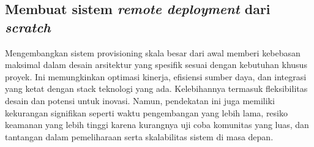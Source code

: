 \subsection{Membuat sistem \textit{remote deployment} dari \textit{scratch}}
Mengembangkan sistem provisioning skala besar dari awal memberi kebebasan maksimal dalam desain arsitektur yang spesifik sesuai dengan kebutuhan khusus proyek. Ini memungkinkan optimasi kinerja, efisiensi sumber daya, dan integrasi yang ketat dengan stack teknologi yang ada. Kelebihannya termasuk fleksibilitas desain dan potensi untuk inovasi. Namun, pendekatan ini juga memiliki kekurangan signifikan seperti waktu pengembangan yang lebih lama, resiko keamanan yang lebih tinggi karena kurangnya uji coba komunitas yang luas, dan tantangan dalam pemeliharaan serta skalabilitas sistem di masa depan.